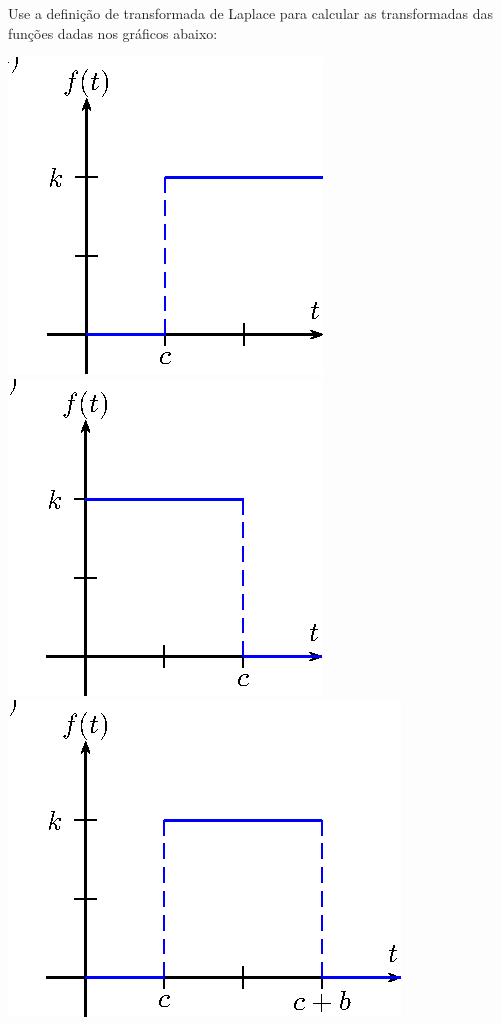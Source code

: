 \begin{exer}{\label{ex_cap_3_1}} Use a definição de transformada de Laplace para calcular as transformadas das funções dadas nos gráficos abaixo:
\begin{center}

\includegraphics{cap_definicao/pics/figura_4}
\includegraphics{cap_definicao/pics/figura_5}
\includegraphics{cap_definicao/pics/figura_6}

\end{center}
\end{exer}
